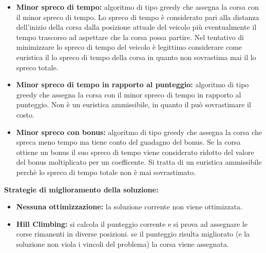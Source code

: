 \documentclass[11pt,a4paper]{article}
\begin{document}
\begin{itemize}
\begin{itemize}
		\item \textbf{Minor spreco di tempo:} algoritmo di tipo greedy che assegna la corsa con il minor spreco di tempo. Lo spreco di tempo è considerato pari alla distanza dell'inizio della corsa dalla posizione attuale del veicolo più eventualmente il tempo trascorso ad aspettare che la corsa possa partire. Nel tentativo di minimizzare lo spreco di tempo del veicolo è legittimo considerare come euristica il lo spreco di tempo della corsa in quanto non sovrastima mai il lo spreco totale.
		\item \textbf{Minor spreco di tempo in rapporto al punteggio:} algoritmo di tipo greedy che assegna la corsa con il minor spreco di tempo in rapporto al punteggio. Non è un euristica ammissibile, in quanto il può sovrastimare il costo.
		\item \textbf{Minor spreco con bonus:} algoritmo di tipo greedy che assegna la corsa che spreca meno tempo ma tiene conto del guadagno del bonus. Se la corsa ottiene un bonus il suo spreco di tempo viene considerato ridotto del valore del bonus moltiplicato per un coefficente. Si tratta di un euristica ammissibile perchè lo spreco di tempo totale non è mai sovrastimato. 
		
	\end{itemize}
	\textbf{Strategie di miglioramento della soluzione:}
	\begin{itemize}
		\item \textbf{Nessuna ottimizzazione:} la soluzione corrente non viene ottimizzata.
		\item \textbf{Hill Climbing:} si calcola il punteggio corrente e si prova ad assegnare le corse rimanenti in diverse posizioni. se il punteggio risulta migliorato (e la soluzione non viola i vincoli del problema) la corsa viene assegnata.
	\end{itemize}
	
		
\end{itemize}
\end{document}
